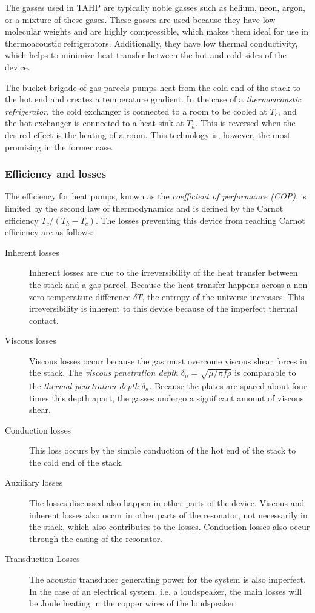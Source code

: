 \documentclass{article}
\begin{document}
The gasses used in TAHP are typically noble gasses such as helium, neon, argon, or a mixture of these gases. These gasses are used because they have low molecular weights and are highly compressible, which makes them ideal for use in thermoacoustic refrigerators. Additionally, they have low thermal conductivity, which helps to minimize heat transfer between the hot and cold sides of the device.

The bucket brigade of gas parcels pumps heat from the cold end of the stack to the hot end and creates a temperature gradient. In the case of a \emph{thermoacoustic refrigerator}, the cold exchanger is connected to a room to be cooled at \(T_c\), and the hot exchanger is connected to a heat sink at \(T_h\). This is reversed when the desired effect is the heating of a room. This technology is, however, the most promising in the former case.

\subsubsection{Efficiency and losses}
The efficiency for heat pumps, known as the \emph{coefficient of performance (COP)}, is limited by the second law of thermodynamics and is defined by the Carnot efficiency \(T_c/(T_h-T_c)\). The losses preventing this device from reaching Carnot efficiency are as follows:
\begin{description}
  \item[Inherent losses] Inherent losses are due to the irreversibility of the heat transfer between the stack and a gas parcel. Because the heat transfer happens across a non-zero temperature difference \(\delta T\), the entropy of the universe increases. This irreversibility is inherent to this device because of the imperfect thermal contact. %
  \item[Viscous losses] Viscous losses occur because the gas must overcome viscous shear forces in the stack. The \emph{viscous penetration depth} \(\delta_\mu=\sqrt{\mu / \pi f \rho} \) is comparable to the \emph{thermal penetration depth} \(\delta_\kappa\). Because the plates are spaced about four times this depth apart, the gasses undergo a significant amount of viscous shear.
  \item[Conduction losses] This loss occurs by the simple conduction of the hot end of the stack to the cold end of the stack.
  \item[Auxiliary losses] The losses discussed also happen in other parts of the device. Viscous and inherent losses also occur in other parts of the resonator, not necessarily in the stack, which also contributes to the losses. Conduction losses also occur through the casing of the resonator.
  \item[Transduction Losses] The acoustic transducer generating power for the system is also imperfect. In the case of an electrical system, i.e. a loudspeaker, the main losses will be Joule heating in the copper wires of the loudspeaker.
\end{description}
\end{document}
